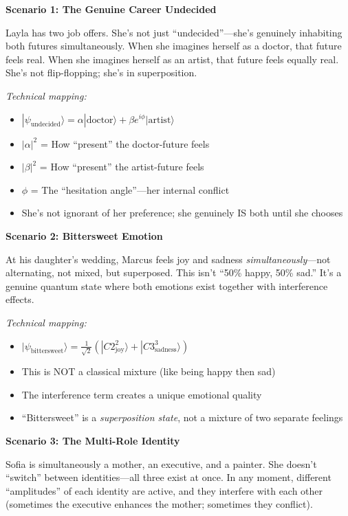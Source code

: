 \documentclass[11pt,twoside]{book}
\begin{document}
\begin{tcolorbox}[colback=yellow!5!white,colframe=yellow!65!black,title=\textbf{Real-Life Scenarios: Quantum Superposition},breakable]

\textbf{Scenario 1: The Genuine Career Undecided}

Layla has two job offers. She's not just ``undecided''---she's genuinely inhabiting both futures simultaneously. When she imagines herself as a doctor, that future feels real. When she imagines herself as an artist, that future feels equally real. She's not flip-flopping; she's in superposition.

\textit{Technical mapping:}
\begin{itemize}
    \item $|\psi_{\mathrm{undecided}}\rangle = \alpha|\text{doctor}\rangle + \beta e^{i\phi}|\text{artist}\rangle$
    \item $|\alpha|^2$ = How ``present'' the doctor-future feels
    \item $|\beta|^2$ = How ``present'' the artist-future feels
    \item $\phi$ = The ``hesitation angle''---her internal conflict
    \item She's not ignorant of her preference; she genuinely IS both until she chooses
\end{itemize}

\textbf{Scenario 2: Bittersweet Emotion}

At his daughter's wedding, Marcus feels joy and sadness \textit{simultaneously}---not alternating, not mixed, but superposed. This isn't ``50\% happy, 50\% sad.'' It's a genuine quantum state where both emotions exist together with interference effects.

\textit{Technical mapping:}
\begin{itemize}
    \item $|\psi_{\mathrm{bittersweet}}\rangle = \frac{1}{\sqrt{2}}(|C2^2_{\text{joy}}\rangle + |C3^3_{\text{sadness}}\rangle)$
    \item This is NOT a classical mixture (like being happy then sad)
    \item The interference term creates a unique emotional quality
    \item ``Bittersweet'' is a \textit{superposition state}, not a mixture of two separate feelings
\end{itemize}

\textbf{Scenario 3: The Multi-Role Identity}

Sofia is simultaneously a mother, an executive, and a painter. She doesn't ``switch'' between identities---all three exist at once. In any moment, different ``amplitudes'' of each identity are active, and they interfere with each other (sometimes the executive enhances the mother; sometimes they conflict).


\end{tcolorbox}
\end{document}
